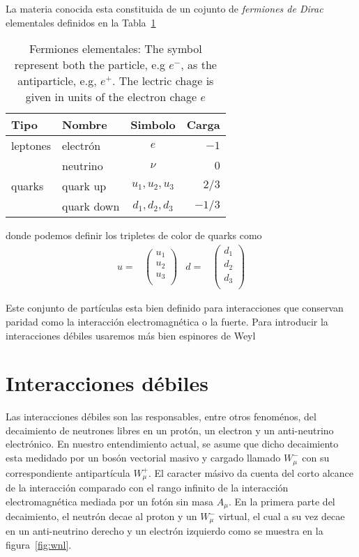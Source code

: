 \begin{frame}
La materia conocida esta constituida de un cojunto de \emph{fermiones de Dirac} elementales definidos en la Tabla~\ref{tab:ef}
\begin{table}
  \centering
  \begin{tabular}{l|l|c|r}
    Tipo &Nombre & Simbolo&Carga\\\hline{}
   leptones& electrón & $e$& $-1$\\
          & neutrino & $\nu$ & $0$\\\hline{}
   quarks &quark up  & $u_1,u_2,u_3$ & $2/3$\\
          &quark down  & $d_1,d_2,d_3$& $-1/3$\\
  \end{tabular}
  \caption{Fermiones elementales:  The symbol represent both the particle, e.g $e^-$, as the antiparticle, e.g, $e^+$. The lectric chage is given in units of the electron chage $e$  }
  \label{tab:ef}
\end{table}
donde podemos definir los tripletes de color de quarks como
\begin{align}
  u=&
  \begin{pmatrix}
    u_1 \\ u_2\\ u_3\\
  \end{pmatrix}
  &d=&
  \begin{pmatrix}
    d_1 \\ d_2 \\ d_3\\
  \end{pmatrix}
\end{align}

Este conjunto de partículas esta bien definido para interacciones que conservan paridad como la interacción electromagnética o la fuerte. Para introducir la interacciones débiles usaremos más bien espinores de Weyl

\end{frame}

\section{Interacciones débiles}
Las interacciones débiles son las responsables, entre otros fenoménos,
del decaimiento de neutrones libres en un protón, un electron y un
anti-neutrino electrónico. En nuestro entendimiento actual, se asume
que dicho decaimiento esta medidado por un bosón vectorial masivo y
cargado llamado $W^-_{\mu}$ con su correspondiente antipartícula
$W^{+}_{\mu}$. El caracter másivo da cuenta del corto alcance de la
interacción comparado con el rango infinito de la
interacción electromagnética mediada por un fotón sin masa
$A_{\mu}$. En la primera parte del decaimiento, el neutrón decae al
proton y un $W^{-}_{\mu}$ virtual, el cual a su vez decae en un
anti-neutrino derecho y un electrón izquierdo como se muestra en la
figura~\ref{fig:wnl}.

